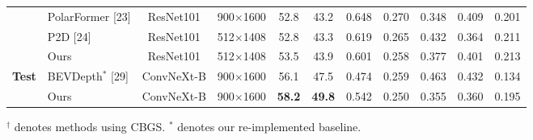 \documentclass[12pt, UTF8]{ctexart}
\begin{document}
\begin{table}[H]
{\begin{tabular}{llccccccccc}
& PolarFormer [23] & ResNet101 & 900$\times$1600 & 52.8 & 43.2 & 0.648 & 0.270 & 0.348 & 0.409 & 0.201 \\
& P2D [24] & ResNet101 & 512$\times$1408 & 52.8 & 43.3 & 0.619 & 0.265 & 0.432 & 0.364 & 0.211 \\
& Ours & ResNet101 & 512$\times$1408 & 53.5 & 43.9 & 0.601 & 0.258 & 0.377 & 0.401 & 0.213 \\
\midrule
\multirow{2}{*}{\textbf{Test}}
& BEVDepth$^{*}$ [29] & ConvNeXt-B & 900$\times$1600 & 56.1 & 47.5 & 0.474 & 0.259 & 0.463 & 0.432 & 0.134 \\
& Ours & ConvNeXt-B & 900$\times$1600 & \textbf{58.2} & \textbf{49.8} & 0.542 & 0.250 & 0.355 & 0.360 & 0.195 \\
\bottomrule
\end{tabular}
}
\vspace{2mm}
\noindent\footnotesize{$^{\dagger}$ denotes methods using CBGS. $^{*}$ denotes our re-implemented baseline.}
\end{table}
\end{document}
